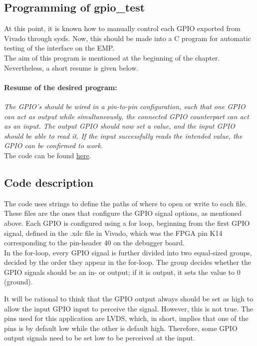 \subsection{Programming of gpio\_test}
At this point, it is known how to manually control each GPIO exported from Vivado through sysfs. Now, this should be made into a C program for automatic testing of the interface on the EMP.\\
\noindent The aim of this program is mentioned at the beginning of the chapter. Nevertheless, a short resume is given below.

\vspace{-0.2 cm}
\paragraph{Resume of the desired program:} \hspace{-0.4 cm} \textit{
The GPIO’s should be wired in a pin-to-pin configuration, such that one GPIO can act as output while simultaneously, the connected GPIO counterpart can act as an input.
The output GPIO should now set a value, and the input GPIO should be able to read it. If the input successfully reads the intended value, the GPIO can be confirmed to work.
}\\

\noindent The code can be found \href{https://gitlab.cern.ch/esandgaa/gpio_test}{here}. 

\subsection*{Code description} 
The code uses strings to define the paths of where to open or write to each file. These files are the ones that configure the GPIO signal options, as mentioned above. Each GPIO is configured using a for loop, beginning from the first GPIO signal, defined in the .xdc file in Vivado, which was the FPGA pin K14 corresponding to the pin-header 40 on the debugger board.\\

\noindent In the for-loop, every GPIO signal is further divided into two equal-sized groups, decided by the order they appear in the for-loop. The group decides whether the GPIO signals should be an in- or output; if it is output, it sets the value to 0 (ground). 

\begin{example}
It will be rational to think that the GPIO output always should be set as high to allow the input GPIO input to perceive the signal. However, this is not true. The pins used for this application are LVDS, which, in short, implies that one of the pins is by default low while the other is default high. Therefore, some GPIO output signals need to be set low to be perceived at the input. 
\end{example}

